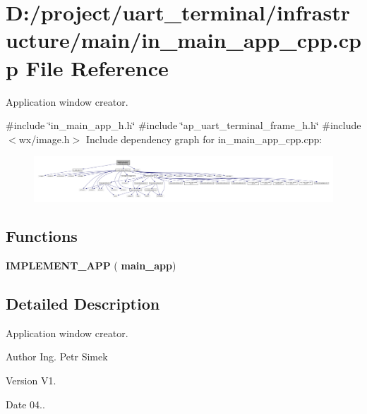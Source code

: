 \section{D\+:/project/uart\+\_\+terminal/infrastructure/main/in\+\_\+main\+\_\+app\+\_\+cpp.cpp File Reference}
\label{in__main__app__cpp_8cpp}


Application window creator.  


{\ttfamily \#include \char`\"{}in\+\_\+main\+\_\+app\+\_\+h.\+h\char`\"{}}\newline
{\ttfamily \#include \char`\"{}ap\+\_\+uart\+\_\+terminal\+\_\+frame\+\_\+h.\+h\char`\"{}}\newline
{\ttfamily \#include $<$wx/image.\+h$>$}\newline
Include dependency graph for in\+\_\+main\+\_\+app\+\_\+cpp.\+cpp\+:
\nopagebreak
\begin{figure}[H]
\begin{center}
\leavevmode
\includegraphics[width=350pt]{in__main__app__cpp_8cpp__incl}
\end{center}
\end{figure}
\subsection*{Functions}
\begin{DoxyCompactItemize}
\item 
\textbf{ I\+M\+P\+L\+E\+M\+E\+N\+T\+\_\+\+A\+PP} (\textbf{ main\+\_\+app})
\end{DoxyCompactItemize}


\subsection{Detailed Description}
Application window creator. 

\begin{DoxyAuthor}{Author}
Ing. Petr Simek 
\end{DoxyAuthor}
\begin{DoxyVersion}{Version}
V1. 
\end{DoxyVersion}
\begin{DoxyDate}{Date}
04.. 
\end{DoxyDate}

